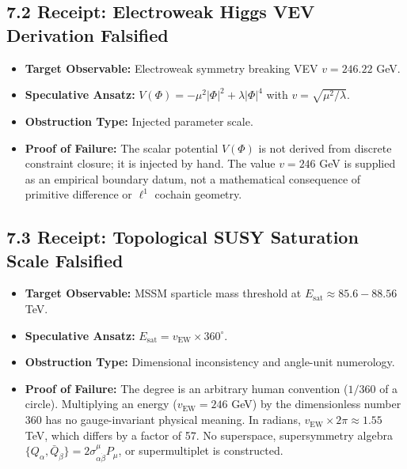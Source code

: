 \documentclass[11pt]{article}
\begin{document}
\subsection{\texorpdfstring{7.2 Receipt: Electroweak Higgs VEV Derivation Falsified}{7.2 Receipt: Electroweak Higgs VEV Derivation Falsified}}

\begin{itemize}[leftmargin=1.4em,itemsep=0.2em]
\item \textbf{Target Observable:} Electroweak symmetry breaking VEV $v = 246.22$ GeV.
\item \textbf{Speculative Ansatz:} $V(\Phi) = -\mu^2 |\Phi|^2 + \lambda |\Phi|^4$ with $v = \sqrt{\mu^2 / \lambda}$.
\item \textbf{Obstruction Type:} Injected parameter scale.
\item \textbf{Proof of Failure:} The scalar potential $V(\Phi)$ is not derived from discrete constraint closure; it is injected by hand. The value $v = 246$ GeV is supplied as an empirical boundary datum, not a mathematical consequence of primitive difference or $\ell^1$ cochain geometry.
\end{itemize}
\subsection{\texorpdfstring{7.3 Receipt: Topological SUSY Saturation Scale Falsified}{7.3 Receipt: Topological SUSY Saturation Scale Falsified}}

\begin{itemize}[leftmargin=1.4em,itemsep=0.2em]
\item \textbf{Target Observable:} MSSM sparticle mass threshold at $E_{\mathrm{sat}} \approx 85.6 - 88.56$ TeV.
\item \textbf{Speculative Ansatz:} $E_{\mathrm{sat}} = v_{\mathrm{EW}} \times 360^\circ$.
\item \textbf{Obstruction Type:} Dimensional inconsistency and angle-unit numerology.
\item \textbf{Proof of Failure:} The degree is an arbitrary human convention ($1/360$ of a circle). Multiplying an energy ($v_{\mathrm{EW}} = 246$ GeV) by the dimensionless number 360 has no gauge-invariant physical meaning. In radians, $v_{\mathrm{EW}} \times 2\pi \approx 1.55$ TeV, which differs by a factor of 57. No superspace, supersymmetry algebra $\{Q_\alpha, \bar{Q}_{\dot{\beta}}\} = 2 \sigma^\mu_{\alpha\dot{\beta}} P_\mu$, or supermultiplet is constructed.
\end{itemize}
\end{document}
